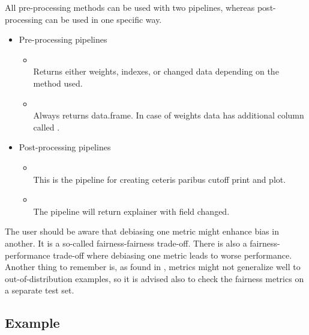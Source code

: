 All pre-processing methods can be used with two pipelines, whereas
post-processing can be used in one specific way.

\begin{itemize}
\tightlist
\item
  Pre-processing pipelines

  \begin{itemize}
  \tightlist
  \item
    ~\\
    Returns either weights, indexes, or changed data depending on the
    method used.
  \item
    ~\\
    Always returns data.frame. In case of weights data has additional
    column called .
  \end{itemize}
\item
  Post-processing pipelines

  \begin{itemize}
  \tightlist
  \item
    ~\\
    This is the pipeline for creating ceteris paribus cutoff print and
    plot.
  \item
    ~\\
    The pipeline will return explainer with  field
    changed.
  \end{itemize}
\end{itemize}

The user should be aware that debiasing one metric might enhance bias in
another. It is a so-called fairness-fairness trade-off. There is also a
fairness-performance trade-off where debiasing one metric leads to worse
performance. Another thing to remember is, as found in
\citet{Agrawal2020DebiasingCI}, metrics might not generalize well to
out-of-distribution examples, so it is advised also to check the
fairness metrics on a separate test set.

\hypertarget{example-1}{%
\subsection{Example}\label{example-1}}

